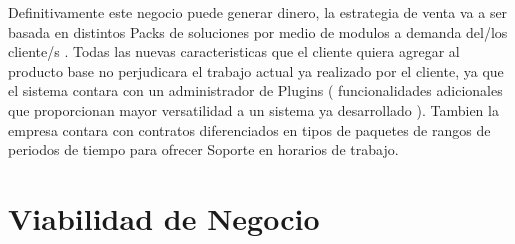 \documentclass[
10pt, %
a4paper, %
oneside, %
headinclude,footinclude, %
BCOR5mm, %
]{scrartcl}
\begin{document}
Definitivamente este negocio puede generar dinero, la estrategia de venta
va a ser basada en distintos Packs de soluciones por medio de modulos
a demanda del/los cliente/s . Todas las nuevas caracteristicas que el cliente
quiera agregar al producto base no perjudicara el trabajo actual ya realizado
por el cliente, ya que el sistema contara con un administrador de
Plugins ( funcionalidades adicionales que proporcionan mayor versatilidad a un
sistema ya desarrollado ).
Tambien la empresa contara con contratos diferenciados en tipos de paquetes de
rangos de periodos de tiempo para ofrecer Soporte en horarios de trabajo.


\section {Viabilidad de Negocio}
\end{document}

